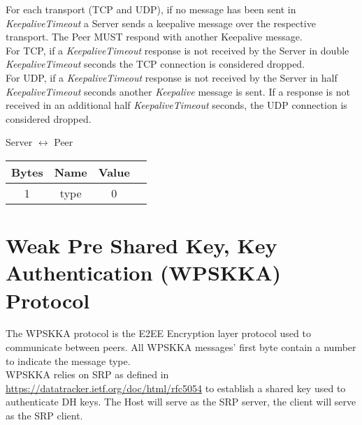 \documentclass{article}
\begin{document}
    For each transport (TCP and UDP), if no message has been sent in \emph{KeepaliveTimeout} a Server sends a keepalive
    message over the respective transport. The Peer MUST respond with another Keepalive message.\\

    For TCP, if a \emph{KeepaliveTimeout} response is not received by the Server in
    double \emph{KeepaliveTimeout} seconds the TCP connection is considered dropped.\\

    For UDP, if a \emph{KeepaliveTimeout} response is not received by the Server in
    half  \emph{KeepaliveTimeout} seconds another \emph{Keepalive} message is sent. If a response is not received in
    an additional half \emph{KeepaliveTimeout} seconds, the UDP connection is considered dropped.

    \begin{center}
        Server $\leftrightarrow$ Peer\\
        \begin{tabular}{|c|c|c|c|}
            \hline
            \textbf{Bytes} & \textbf{Name} & \textbf{Value} \\
            \hline
            1              & type          & 0              \\
            \hline
        \end{tabular}
    \end{center}


    \section{Weak Pre Shared Key, Key Authentication (WPSKKA) Protocol}

    The WPSKKA protocol is the E2EE Encryption layer protocol used to communicate between peers. All WPSKKA messages'
    first byte contain a number to indicate
    the message type.\\

    WPSKKA relies on SRP as defined in \href{RFC5054}{https://datatracker.ietf.org/doc/html/rfc5054} to establish a
    shared key used to authenticate DH keys. The Host will serve as the SRP server, the client will serve as the SRP
    client.\\
\end{document}
